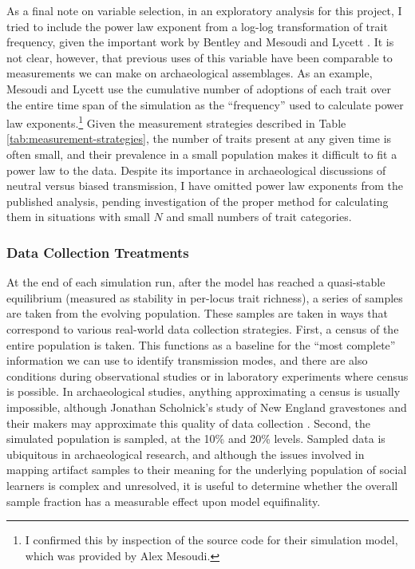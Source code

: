 \documentclass[10pt,letterpaper]{article}
\begin{document}
As a final note on variable selection, in an exploratory analysis for this
project, I tried to include the power law exponent from a log-log
transformation of trait frequency, given the important work by Bentley
\cite{bentley2004random} and Mesoudi and Lycett
\cite{Mesoudi2009}. It is not clear, however, that previous uses
of this variable have been comparable to measurements we can make on
archaeological assemblages. As an example, Mesoudi and Lycett
\cite{Mesoudi2009} use the cumulative number of adoptions of each
trait over the entire time span of the simulation as the ``frequency''
used to calculate power law
exponents.\footnote{I confirmed this by inspection of the source code for their simulation model, which was provided by Alex Mesoudi.}
Given the measurement strategies described in Table
\ref{tab:measurement-strategies}, the number of traits present at any
given time is often small, and their prevalence in a small population
makes it difficult to fit a power law to the data. Despite its
importance in archaeological discussions of neutral versus biased
transmission, I have omitted power law exponents from the published
analysis, pending investigation of the proper method for calculating
them in situations with small \(N\) and small numbers of trait
categories.

\subsubsection{Data Collection Treatments}\label{data-collection-treatments}

At the end of each simulation run, after the model has reached a quasi-stable equilibrium (measured as stability in per-locus trait richness), a series of samples are taken from the evolving population.  These samples are taken in ways that correspond to various real-world data collection strategies.  First, a census of the entire population is taken.  This functions as a baseline for the ``most complete'' information we can use to identify transmission modes, and there are also conditions during observational studies or in laboratory experiments where census is possible.  In archaeological studies, anything approximating a census is usually impossible, although Jonathan Scholnick's study of New England gravestones and their makers may approximate this quality of data collection \cite{scholnick2012spatial}.  Second, the simulated population is sampled, at the 10\% and 20\% levels.  Sampled data is ubiquitous in archaeological research, and although the issues involved in mapping artifact samples to their meaning for the underlying population of social learners is complex and unresolved, it is useful to determine whether the overall sample fraction has a measurable effect upon model equifinality.  
\end{document}
